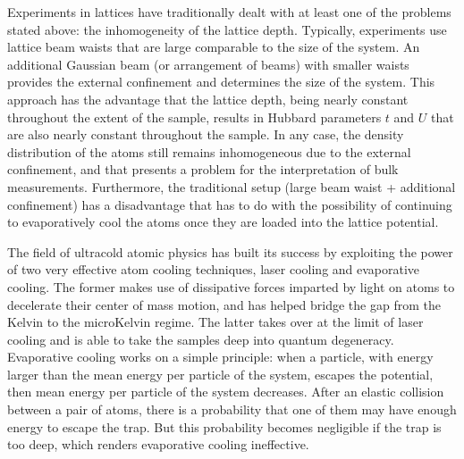 Experiments in lattices have traditionally dealt with at least one of the
problems stated above: the inhomogeneity of the lattice depth.    Typically,
experiments use lattice beam waists that are large comparable to the size of
the system.   An additional Gaussian beam (or arrangement of beams) with
smaller waists provides the external confinement and determines the size of the
system.   This approach has the advantage that the lattice depth, being nearly
constant throughout the extent of the sample, results in Hubbard parameters $t$
and $U$ that are also nearly constant throughout the sample. In any case, the
density distribution of the atoms still remains inhomogeneous due to the
external confinement, and that presents a problem for the interpretation of
bulk measurements.   Furthermore, the traditional setup (large beam waist +
additional confinement)  has a disadvantage that has to do with the possibility
of continuing to evaporatively cool the atoms once they are loaded into the
lattice potential.  

The field of ultracold atomic physics has built its success by exploiting the
power of two very effective atom cooling techniques, laser cooling and
evaporative cooling.  The former makes use of dissipative forces imparted by
light on atoms to decelerate their center of mass motion,  and has helped
bridge the gap from the Kelvin to the microKelvin regime.  The latter takes
over at the limit of laser cooling and is able to take the samples deep into
quantum degeneracy.  Evaporative cooling works on a simple principle: when a
particle, with energy larger than the mean energy per particle of the system,
escapes the potential, then mean energy per particle of the system decreases.
After an elastic collision between a pair of atoms, there is a probability that
one of them may have enough energy to escape the trap.  But this probability
becomes negligible if the trap is too deep, which renders evaporative cooling
ineffective. 


